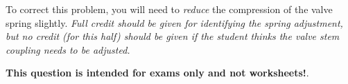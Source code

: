 \vskip 10pt

To correct this problem, you will need to {\it reduce} the compression of the valve spring slightly.  {\it Full credit should be given for identifying the spring adjustment, but no credit (for this half) should be given if the student thinks the valve stem coupling needs to be adjusted.}







{\bf This question is intended for exams only and not worksheets!}.



